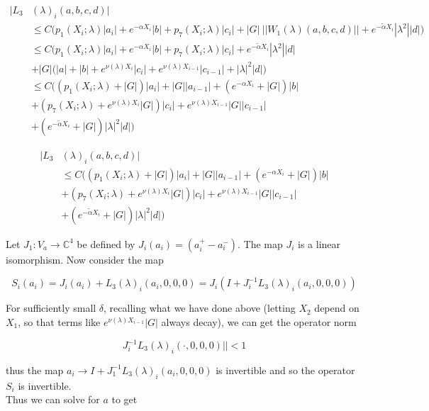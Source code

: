 \documentclass[12pt]{article}
\def\C{{\mathbb C}}
\begin{document}
\begin{enumerate}
\begin{align*}
|L_3&(\lambda)_i(a, b, c, d)| \\
&\leq C \Big( p_1(X_i; \lambda)|a_i|
+ e^{-\alpha X_i}|b| + p_7(X_i; \lambda)|c_i| + |G|\:||W_1(\lambda)(a,b,c,d)|| + e^{-\tilde{\alpha} X_i} |\lambda^2| |d| \Big) \\
& \leq C \Big( p_1(X_i; \lambda)|a_i|
+ e^{-\alpha X_i}|b| + p_7(X_i; \lambda)|c_i| + e^{-\tilde{\alpha} X_i} |\lambda^2| |d| \\
&+ |G| (|a| + |b| + e^{\nu(\lambda)X_i}|c_i| + e^{\nu(\lambda)X_{i-1}}|c_{i-1}| + |\lambda|^2 |d| \Big) \\
& \leq C \Big( (p_1(X_i; \lambda) + |G|)|a_i| + |G||a_{i-1}| + (e^{-\alpha X_i} + |G|) |b| \\
&+ ( p_7(X_i; \lambda) + e^{\nu(\lambda)X_i} |G|) |c_i| + e^{\nu(\lambda)X_{i-1}} |G| |c_{i-1}| \\
&+ (e^{-\tilde{\alpha} X_i} + |G|) |\lambda|^2 |d| \Big)
\end{align*} 



\begin{align*}
|L_3&(\lambda)_i(a, b, c, d)| \\
&\leq C \Big( (p_1(X_i; \lambda) + |G|)|a_i| + |G||a_{i-1}| + (e^{-\alpha X_i} + |G|) |b| \\
&+ ( p_7(X_i; \lambda) + e^{\nu(\lambda)X_i} |G|) |c_i| + e^{\nu(\lambda)X_{i-1}} |G| |c_{i-1}| \\
&+ (e^{-\tilde{\alpha} X_i} + |G|) |\lambda|^2 |d| \Big)
\end{align*} 

Let $J_1: V_a \rightarrow \C^4$ be defined by $J_i(a_i) = (a_i^+ - a_i^-)$. The map $J_i$ is a linear isomorphism. Now consider the map

\[
S_i(a_i) = J_i (a_i) + L_3(\lambda)_i(a_i, 0, 0, 0) = J_i( I + J_i^{-1} L_3(\lambda)_i(a_i, 0, 0, 0))
\]

For sufficiently small $\delta$, recalling what we have done above (letting $X_2$ depend on $X_1$, so that terms like $e^{\nu(\lambda)X_{i-1}} |G|$ always decay), we can get the operator norm 

\[
J_i^{-1} L_3(\lambda)_i(\cdot, 0, 0, 0)|| < 1
\]

thus the map $a_i \rightarrow I + J_1^{-1} L_3(\lambda)_i(a_i, 0, 0, 0)$ is invertible and so the operator $S_i$ is invertible.\\

Thus we can solve for $a$ to get


\end{enumerate}
\end{document}
